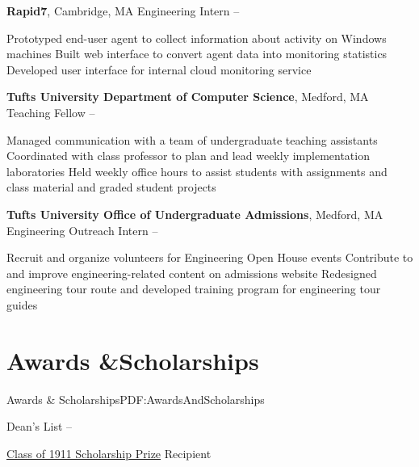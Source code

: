 \documentclass[letterpaper,MMMyyyy,nonstop]{simpleresumecv}
\begin{document}
\begin{body}
\BigGap

\textbf{Rapid7}, Cambridge, MA
\GapNoBreak
\BulletItem
Engineering Intern
\hfill
{} -- 
\begin{detail}
\SubBulletItem
Prototyped end-user agent to collect information about activity on Windows machines
\SubBulletItem
Built web interface to convert agent data into monitoring statistics
\SubBulletItem
Developed user interface for internal cloud monitoring service
\end{detail}

\BigGap

\textbf{Tufts University Department of Computer Science}, Medford, MA
\GapNoBreak
\BulletItem
Teaching Fellow
\hfill
{} -- 
\begin{detail}
\SubBulletItem
Managed communication with a team of undergraduate teaching assistants
\SubBulletItem
Coordinated with class professor to plan and lead weekly implementation laboratories
\SubBulletItem
Held weekly office hours to assist students with assignments and class material and graded student projects
\end{detail}

\BigGap

\textbf{Tufts University Office of Undergraduate Admissions}, Medford, MA
\GapNoBreak
\BulletItem
Engineering Outreach Intern
\hfill
{} -- 
\begin{detail}
\SubBulletItem
Recruit and organize volunteers for Engineering Open House events
\SubBulletItem
Contribute to and improve engineering-related content on admissions website
\SubBulletItem
Redesigned engineering tour route and developed training program for engineering tour guides
\end{detail}


\section{Awards \&\newline Scholarships}{Awards \& Scholarships}{PDF:AwardsAndScholarships}

\BulletItem
Dean's List
\hfill
{} -- 

\BulletItem
\href{http://students.tufts.edu/academic-advice-and-support/academic-advising/what-we-offer/guidance-academic-policies/academic-awards}{Class of 1911 Scholarship Prize} Recipient
\hfill
{}


\end{body}
\end{document}
